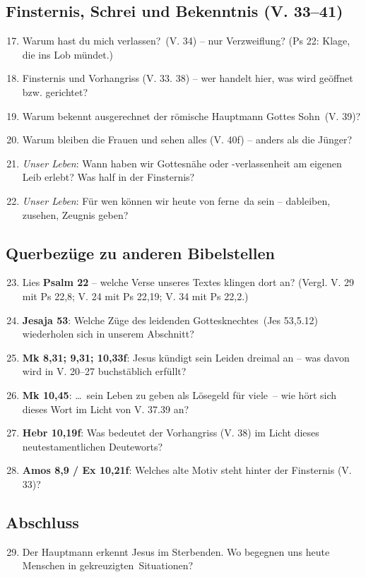 \documentclass[12pt,a4paper]{article}
\begin{document}
\subsection*{Finsternis, Schrei und Bekenntnis (V. 33--41)}
\begin{enumerate}\setcounter{enumi}{16}
  \item \glqq Warum hast du mich verlassen?\grqq\ (V. 34) -- nur Verzweiflung? (Ps 22: Klage, die ins Lob mündet.)
  \item Finsternis und Vorhangriss (V. 33. 38) -- wer handelt hier, was wird geöffnet bzw. gerichtet?
  \item Warum bekennt ausgerechnet der römische Hauptmann \glqq Gottes Sohn\grqq\ (V. 39)?
  \item Warum bleiben die Frauen und sehen alles (V. 40f) -- anders als die Jünger?
  \item \emph{Unser Leben}: Wann haben wir Gottesnähe oder -verlassenheit am eigenen Leib erlebt? Was half in der Finsternis?
  \item \emph{Unser Leben}: Für wen können wir heute \glqq von ferne\grqq\ da sein -- dableiben, zusehen, Zeugnis geben?
\end{enumerate}

\subsection*{Querbezüge zu anderen Bibelstellen}
\begin{enumerate}\setcounter{enumi}{22}
  \item Lies \textbf{Psalm 22} -- welche Verse unseres Textes klingen dort an? (Vergl. V. 29 mit Ps 22,8; V. 24 mit Ps 22,19; V. 34 mit Ps 22,2.)
  \item \textbf{Jesaja 53}: Welche Züge des \glqq leidenden Gottesknechtes\grqq\ (Jes 53,5.12) wiederholen sich in unserem Abschnitt?
  \item \textbf{Mk 8,31; 9,31; 10,33f}: Jesus kündigt sein Leiden dreimal an -- was davon wird in V. 20--27 buchstäblich erfüllt?
  \item \textbf{Mk 10,45}: \glqq \ldots\ sein Leben zu geben als Lösegeld für viele\grqq\ -- wie hört sich dieses Wort im Licht von V. 37.39 an?
  \item \textbf{Hebr 10,19f}: Was bedeutet der Vorhangriss (V. 38) im Licht dieses neutestamentlichen Deuteworts?
  \item \textbf{Amos 8,9 / Ex 10,21f}: Welches alte Motiv steht hinter der Finsternis (V. 33)?
\end{enumerate}

\subsection*{Abschluss}
\begin{enumerate}\setcounter{enumi}{28}
  \item Der Hauptmann erkennt Jesus im Sterbenden. Wo begegnen uns heute Menschen in \glqq gekreuzigten\grqq\ Situationen?
\end{enumerate}
\end{document}
